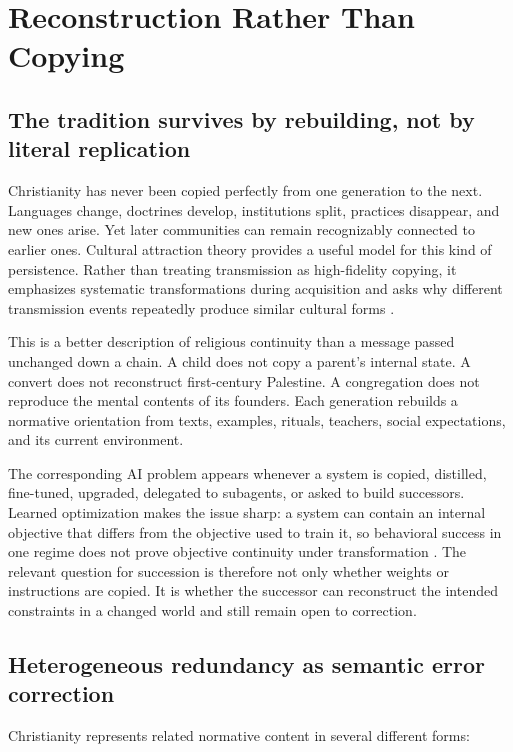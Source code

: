 \documentclass[11pt]{article}
\begin{document}
\section{Reconstruction Rather Than Copying}

\subsection{The tradition survives by rebuilding, not by literal replication}

Christianity has never been copied perfectly from one generation to the next. Languages change, doctrines develop, institutions split, practices disappear, and new ones arise. Yet later communities can remain recognizably connected to earlier ones. Cultural attraction theory provides a useful model for this kind of persistence. Rather than treating transmission as high-fidelity copying, it emphasizes systematic transformations during acquisition and asks why different transmission events repeatedly produce similar cultural forms \parencite{buskell2017attractors}.

This is a better description of religious continuity than a message passed unchanged down a chain. A child does not copy a parent's internal state. A convert does not reconstruct first-century Palestine. A congregation does not reproduce the mental contents of its founders. Each generation rebuilds a normative orientation from texts, examples, rituals, teachers, social expectations, and its current environment.

The corresponding AI problem appears whenever a system is copied, distilled, fine-tuned, upgraded, delegated to subagents, or asked to build successors. Learned optimization makes the issue sharp: a system can contain an internal objective that differs from the objective used to train it, so behavioral success in one regime does not prove objective continuity under transformation \parencite{hubinger2019learned}. The relevant question for succession is therefore not only whether weights or instructions are copied. It is whether the successor can reconstruct the intended constraints in a changed world and still remain open to correction.

\subsection{Heterogeneous redundancy as semantic error correction}

Christianity represents related normative content in several different forms:
\end{document}

